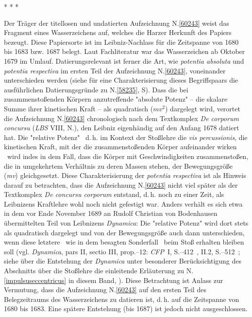 \noindent%
\centering%
*    *    *
\pend%
\newpage%
%
\begin{ledgroup}%
\footnotesize%
\pstart%
\noindent%
%
Der Träger der titellosen und undatierten Aufzeichnung N.\;\ref{60243} weist das Fragment eines Wasserzeichens auf, welches die Harzer Herkunft des Papiers bezeugt. %
Diese Papiersorte ist im Leib\-niz-Nachlass für die Zeitspanne von 1680 bis 1683 bzw. 1687 belegt.
Laut Fachliteratur war das Wasserzeichen ab Oktober 1679 im Umlauf. %
\pend
\pstart
Datierungsrelevant ist ferner die Art, wie \textit{potentia absoluta} und \textit{potentia respectiva} im ersten Teil der Aufzeichnung N.\;\ref{60243},  voneinander unterschieden werden (siehe für eine Charakterisierung dieses Begriffspaars die ausführlichen Datierungsgründe zu N.\;\ref{58235}, S\;\pageref{58235_dat}).
Dass die bei zusammenstoßenden Körpern anzutreffende "absolute Potenz" -- die skalare Summe ihrer kinetischen Kraft -- als quadratisch ($mv^2$) dargelegt wird, verortet die Aufzeichnung N.\;\ref{60243} chronologisch nach dem Textkomplex \textit{De corporum concursu} (\textit{LBS} VIII, N.\cite{01401}), den Leibniz eigenhändig auf den Anfang 1678 datiert hat.
Die "relative Potenz" \textendash\ d.\,h. im Kontext der Stoßlehre die \textit{vis percussionis}, die kinetischen Kraft, mit der die zusammenstoßenden Körper aufeinander wirken %
\textendash\ wird indes in dem Fall, dass die Körper mit Geschwindigkeiten zusammenstoßen, die in umgekehrtem Verhältnis zu deren Massen stehen, der Bewegungsgröße (\textit{mv}) gleichgesetzt.
Diese Charakterisierung der \textit{potentia respectiva} ist als Hinweis darauf zu betrachten, dass die Aufzeichnung N.\;\ref{60243} nicht viel später als der Textkomplex \textit{De concursu corporum}\cite{01401} entstand, d.\,h. noch zu einer Zeit, als Leibnizens Kraftlehre wohl noch nicht gefestigt war.
Anders verhält es sich etwa in dem vor Ende November 1689 an Rudolf Christian von Bodenhausen übermittelten Teil von Leibnizens \textit{Dynamica}:
Die "relative Potenz" wird dort stets als quadratisch dargelegt und von der Bewegungsgröße auch dann unterschieden, wenn diese letztere \textendash\ wie in dem besagten Sonderfall \textendash\ beim Stoß erhalten bleiben soll (vgl. \textit{Dynamica}\cite{01354}, pars II, sectio III, prop.--12: %
\textit{CFP}~I, S.--412~, II.2, S.--512~;\cite{01354} %
siehe über die Entstehung der \textit{Dynamica}\cite{01354} unter besonderer Berücksichtigung des Abschnitts über die Stoßlehre die einleitende Erläuterung zu N.\;\ref{impulsuseccentricus} in diesem Band, ).
\pend%
\pstart%
Diese Betrachtung ist Anlass zur Vermutung, dass die Aufzeichnung N.\;\ref{60243} auf den ersten Teil des Belegzeitraums des Wasserzeichens zu datieren ist, d.\,h. auf die Zeitspanne von 1680 bis 1683.
Eine spätere Entstehung (bis 1687) ist jedoch nicht ausgeschlossen.
\pend%
\end{ledgroup}%
\normalsize%
%
\frenchspacing%
